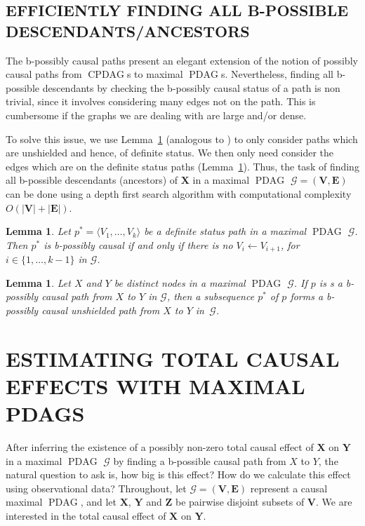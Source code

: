 \documentclass[letterpaper]{article}
\newtheorem{lemma}[theorem]{Lemma}
\theoremstyle{definition}
\theoremstyle{remark}
\DeclareMathOperator{\PDAG}{PDAG}
\DeclareMathOperator{\CPDAG}{CPDAG}
\newcommand{\mpdag}{maximal $\PDAG$}
\newcommand{\MPDAG}{MAXIMAL PDAG}
\newcommand{\vars}[1][V]{\mathbf{#1}}
\newcommand{\e}[1][E]{\mathbf{#1}}
\newcommand{\g}[1][G]{\mathcal{#1}}
\newcommand{\pstar}[1][p]{{#1}^{*}}
\begin{document}
\subsection{EFFICIENTLY FINDING ALL B-POSSIBLE DESCENDANTS/ANCESTORS}
The b-possibly causal paths present an elegant extension of the notion of possibly causal paths from $\CPDAG$s to \mpdag{}s. Nevertheless, finding all b-possible descendants by checking the b-possibly causal status of a path is non trivial, since it involves considering many edges not on the path. This is cumbersome if the graphs we are dealing with are large and/or dense.  

To solve this issue, we use Lemma~\ref{lemma:unshielded-analog} (analogous to \citealp[Lemma~B.1 in][]{zhang2008completeness}) to only consider paths which are unshielded and hence, of definite status. We then only need consider the edges which are on the definite status paths (Lemma~\ref{lemma:def-stat-posdir}).
Thus, the task of finding all b-possible descendants (ancestors) of $\mathbf{X}$ in a \mpdag{} $\g = (\mathbf{V},\mathbf{E})$ can be done using a depth first search algorithm with computational complexity $O(|\mathbf{V}| + |\mathbf{E}|)$.
\begin{lemma}
Let $\pstar = \langle V_1, \dots , V_k \rangle$ be a definite status path in a \mpdag{} $\g$. Then $\pstar$ is b-possibly causal if and only if there is no $V_i \leftarrow V_{i+1}$, for $i \in \{1,\dots, k-1\}$  in $\g$.
\label{lemma:def-stat-posdir}
\end{lemma}
\begin{lemma}
 Let $X$ and $Y$ be distinct nodes in a \mpdag{} $\g$. If $p$ is s a b-possibly causal path from $X$ to $Y$ in $\g$, then a subsequence $\pstar$ of $p$ forms a b-possibly causal unshielded path from $X$ to $Y$ in~$\g$.
\label{lemma:unshielded-analog}
\end{lemma}

\section{ESTIMATING TOTAL CAUSAL EFFECTS WITH \MPDAG{}S} \label{sec:estimate}
After inferring the existence of a possibly non-zero total causal effect of $\mathbf{X}$ on $\mathbf{Y}$ in a \mpdag{} $\g$ by finding a b-possible causal path from $X$ to $Y$, the natural question to ask is, how big is this effect? How do we calculate this effect using observational data?
Throughout, let $\g=(\vars,\e)$ represent a causal \mpdag{}, and let $\mathbf{X}$, $\mathbf{Y}$ and $\mathbf{Z}$ be pairwise disjoint subsets of $\vars$.
We are interested in the total causal effect of $\mathbf{X}$ on $\mathbf{Y}$.
\end{document}
